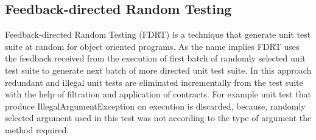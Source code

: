 
\subsection{Feedback-directed Random Testing}
Feedback-directed Random Testing (FDRT) \cite{Pacheco2007} is a technique that generate unit test suite at random for object oriented programs. As the name implies FDRT uses the feedback received from the execution of first batch of randomly selected unit test suite to generate next batch of more directed unit test suite. In this approach redundant and illegal unit tests are eliminated incrementally from the test suite with the help of filtration and application of contracts. For example unit test that produce IllegalArgumentException on execution is discarded, because, randomly selected argument used in this test was not according to the type of argument the method required.

